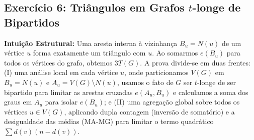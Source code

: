 \documentclass[11pt, a4paper]{article}
\begin{document}
\subsection*{Exercício 6: Triângulos em Grafos $t$-longe de Bipartidos}
\textbf{Intuição Estrutural:} Uma aresta interna à vizinhança $B_u = N(u)$ de um vértice $u$ forma exatamente um triângulo com $u$. Ao somarmos $e(B_u)$ para todos os vértices do grafo, obtemos $3T(G)$. A prova divide-se em duas frentes: (I) uma análise local em cada vértice $u$, onde particionamos $V(G)$ em $B_u = N(u)$ e $A_u = V(G) \setminus N(u)$, usamos o fato de $G$ ser $t$-longe de ser bipartido para limitar as arestas cruzadas $e(A_u, B_u)$ e calculamos a soma dos graus em $A_u$ para isolar $e(B_u)$; e (II) uma agregação global sobre todos os vértices $u \in V(G)$, aplicando dupla contagem (inversão de somatório) e a desigualdade das médias (MA-MG) para limitar o termo quadrático $\sum d(v)(n-d(v))$.
\end{document}
